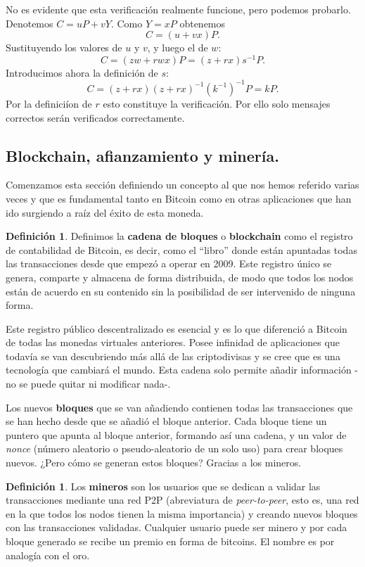 \documentclass[twoside]{article}
\theoremstyle{definition}
\newtheorem{defi}[teorema]{Definición}
\begin{document}
No es evidente que esta verificación realmente funcione, pero podemos probarlo. Denotemos $C=uP+vY$. Como $Y=xP$ obtenemos $$C=(u+vx)P.$$ Sustituyendo los valores de $u$ y $v$, y luego el de $w$: $$ C=(zw+rwx)P= (z+rx)s^{-1}P.$$ Introducimos ahora la definición de $s$: $$C=(z+rx)(z+rx)^{-1}(k^{-1})^{-1}P=kP.$$ Por la definiciíon de $r$ esto constituye la verificación. Por ello solo mensajes correctos serán verificados correctamente. 
\subsection{Blockchain, afianzamiento y minería.}

Comenzamos esta sección definiendo un concepto al que nos hemos referido varias veces y que es fundamental tanto en Bitcoin como en otras aplicaciones que han ido surgiendo a raíz del éxito de esta moneda. 
\begin{defi}
Definimos la \textbf{cadena de bloques} o \textbf{blockchain} como el registro de contabilidad de Bitcoin, es decir, como el ``libro'' donde están apuntadas todas las transacciones desde que empezó a operar en 2009.  Este registro único se genera, comparte y almacena de forma distribuida, de modo que todos los nodos están de acuerdo en su contenido sin la posibilidad de ser intervenido de ninguna forma. 
\end{defi}

Este registro público descentralizado es esencial y es lo que diferenció a Bitcoin de todas las monedas virtuales anteriores. Posee infinidad de aplicaciones que todavía se van descubriendo más allá de las criptodivisas y se cree que es una tecnología que cambiará el mundo. Esta cadena solo permite añadir información -no se puede quitar ni modificar nada-. 

Los nuevos \textbf{bloques} que se van añadiendo contienen todas las transacciones que se han hecho desde que se añadió el bloque anterior. Cada bloque tiene un puntero que apunta al bloque anterior, formando así una cadena, y un valor de \textit{nonce} (número aleatorio o pseudo-aleatorio de un solo uso) para crear bloques nuevos. ¿Pero cómo se generan estos bloques? Gracias a los mineros.
\begin{defi}
Los \textbf{mineros} son los usuarios que se dedican a validar las transacciones mediante una red P2P (abreviatura de \emph{peer-to-peer}, esto es, una red en la que todos los nodos tienen la misma importancia) y creando nuevos bloques con las transacciones validadas. Cualquier usuario puede ser minero y por cada bloque generado se recibe un premio en forma de bitcoins. El nombre es por analogía con el oro.
\end{defi}
\end{document}
